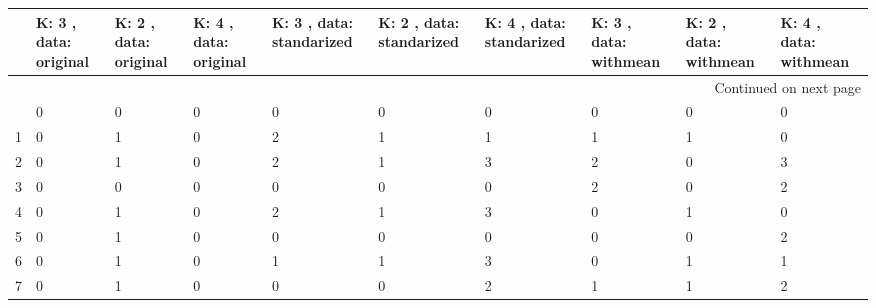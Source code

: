\begin{longtable}{cp{1.5cm}p{1.5cm}p{1.5cm}p{1.5cm}p{1.5cm}p{1.5cm}p{1.5cm}p{1.5cm}p{1.5cm}}
\toprule
{} &  K: 3 , data: original &  K: 2 , data: original &  K: 4 , data: original &  K: 3 , data: standarized &  K: 2 , data: standarized &  K: 4 , data: standarized &  K: 3 , data: withmean &  K: 2 , data: withmean &  K: 4 , data: withmean \\
\midrule
\endhead
\midrule
\multicolumn{10}{r}{{Continued on next page}} \\
\midrule
\endfoot

\bottomrule
\endlastfoot
0  &                      0 &                      0 &                      0 &                         0 &                         0 &                         0 &                      0 &                      0 &                      0 \\
1  &                      0 &                      1 &                      0 &                         2 &                         1 &                         1 &                      1 &                      1 &                      0 \\
2  &                      0 &                      1 &                      0 &                         2 &                         1 &                         3 &                      2 &                      0 &                      3 \\
3  &                      0 &                      0 &                      0 &                         0 &                         0 &                         0 &                      2 &                      0 &                      2 \\
4  &                      0 &                      1 &                      0 &                         2 &                         1 &                         3 &                      0 &                      1 &                      0 \\
5  &                      0 &                      1 &                      0 &                         0 &                         0 &                         0 &                      0 &                      0 &                      2 \\
6  &                      0 &                      1 &                      0 &                         1 &                         1 &                         3 &                      0 &                      1 &                      1 \\
7  &                      0 &                      1 &                      0 &                         0 &                         0 &                         2 &                      1 &                      1 &                      2 \\

\end{longtable}
